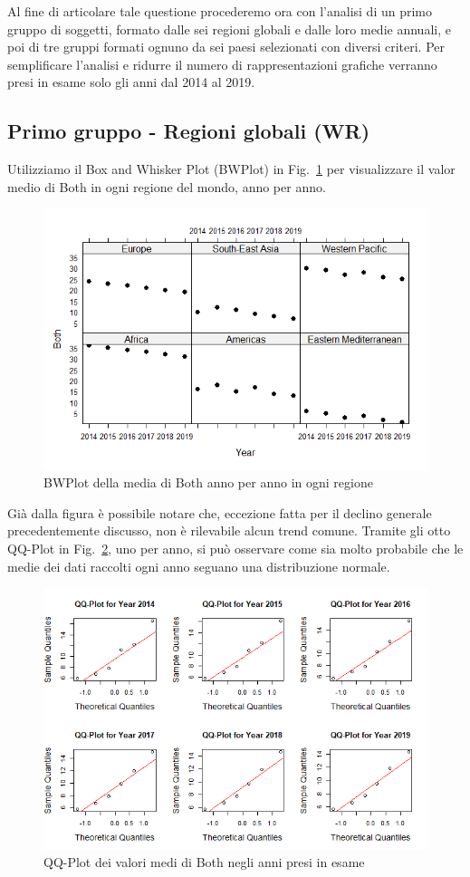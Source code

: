 \documentclass[conference]{IEEEtran}
\begin{document}
Al fine di articolare tale questione procederemo ora con l'analisi di
un primo gruppo di soggetti, formato dalle sei regioni globali e dalle loro medie annuali,
e poi di tre gruppi formati ognuno da sei paesi selezionati con diversi criteri.
Per semplificare l'analisi e ridurre il numero di rappresentazioni grafiche verranno presi in esame solo
gli anni dal 2014 al 2019.

\subsection{Primo gruppo - Regioni globali (WR)}
Utilizziamo il Box and Whisker Plot (BWPlot) in Fig.~\ref{5firstgroup} per visualizzare il
valor medio di Both in ogni regione del mondo, anno per anno.
\begin{figure}[htbp]
    \centerline{\includegraphics[width=.5\textwidth]{img/5 - Firstgroup.png}}
    \caption{BWPlot della media di Both anno per anno in ogni regione}
    \label{5firstgroup}
\end{figure}
Già dalla figura è possibile notare che, eccezione fatta per il declino generale
precedentemente discusso, non è rilevabile
alcun trend comune.
Tramite gli otto QQ-Plot in Fig.~\ref{6firstqq}, uno per anno, si può osservare come sia
molto probabile che le medie dei dati raccolti ogni anno seguano una distribuzione normale.
\begin{figure}[htbp]
    \centerline{\includegraphics[width=.5\textwidth]{img/6 - Firstqq.png}}
    \caption{QQ-Plot dei valori medi di Both negli anni presi in esame}
    \label{6firstqq}
\end{figure}
\end{document}
